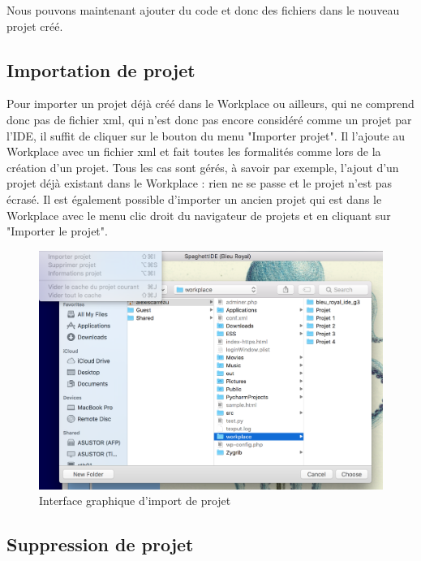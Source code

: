 \documentclass[a4paper,12pt]{article}
\begin{document}
		\newpage

\newpage

Nous pouvons maintenant ajouter du code et donc des fichiers dans le nouveau projet créé.

\subsection{Importation de projet}

Pour importer un projet déjà créé dans le Workplace ou ailleurs, qui ne comprend donc pas de fichier xml, qui n'est donc pas encore considéré comme un projet par l'IDE, il suffit de cliquer sur le bouton du menu "Importer projet". Il l'ajoute au Workplace avec un fichier xml et fait toutes les formalités comme lors de la création d'un projet. Tous les cas sont gérés, à savoir par exemple, l'ajout d'un projet déjà existant dans le Workplace : rien ne se passe et le projet n'est pas écrasé. Il est également possible d'importer un ancien projet qui est dans le Workplace avec le menu clic droit du navigateur de projets et en cliquant sur "Importer le projet".

\begin{figure}[h!]
			\begin{center}
				\includegraphics[scale=0.4]{images/imgs_projet/import.png}
				\caption{Interface graphique d'import de projet}
			\end{center}
		\end{figure}
		
\subsection{Suppression de projet}
\end{document}
